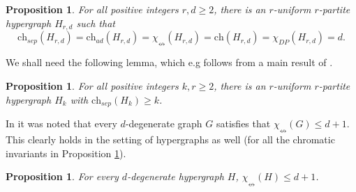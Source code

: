 \documentclass[12pt]{article}
\newtheorem{proposition}[theorem]{Proposition}
\newcommand{\single}{\chi_{\nleftrightarrow}}
\newcommand{\ch}{\mathrm{ch}}
\newcommand{\1}{\mathds{1}}
\begin{document}
	\begin{proposition}
	\label{prop:eq}
		For all positive integers $r,d \geq 2$,
		there is an $r$-uniform $r$-partite hypergraph $H_{r,d}$ such that 
		$$\ch_{sep}(H_{r,d}) = \ch_{ad}(H_{r,d}) = 
		\single(H_{r,d})= \ch(H_{r,d}) = \chi_{DP}(H_{r,d})=d.$$
	\end{proposition}
	
	We shall need the following lemma, which e.g follows from a main result of
	\cite{FurediKostochkaKumbhat}.
	\begin{proposition}
	\label{lem:large}
		For all positive integers $k,r \geq 2$, there is 
		an $r$-uniform $r$-partite hypergraph $H_k$
		with $\ch_{sep}(H_k) \geq k$.
	\end{proposition}
	In \cite{DvorakEsperetKangOzeki} it was noted that every $d$-degenerate
	graph $G$ satisfies that $\single(G) \leq d+1$. This clearly holds in the setting of
	hypergraphs as well (for all the chromatic invariants in Proposition \ref{prop:eq}).
	\begin{proposition}
		For every $d$-degenerate hypergraph $H$, $\single(H) \leq d+1$.	
	\end{proposition}
	
\end{document}
